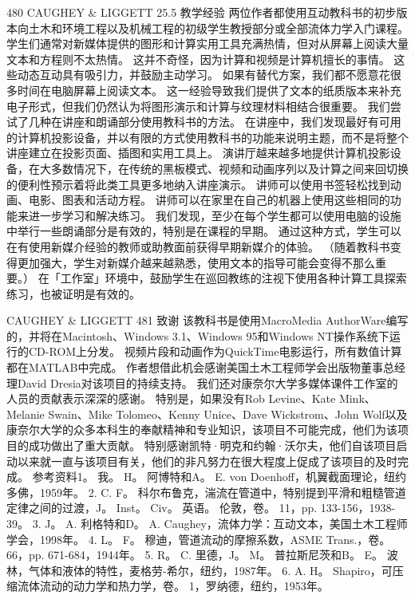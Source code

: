 \documentclass[UTF8,11pt,a4paper,openany,fontset=fandol]{ctexbook}
\begin{document}
480 CAUGHEY \& LIGGETT 25.5 教学经验 两位作者都使用互动教科书的初步版本向土木和环境工程以及机械工程的初级学生教授部分或全部流体力学入门课程。 学生们通常对新媒体提供的图形和计算实用工具充满热情，但对从屏幕上阅读大量文本和方程则不太热情。 这并不奇怪，因为计算和视频是计算机擅长的事情。 这些动态互动具有吸引力，并鼓励主动学习。 如果有替代方案，我们都不愿意花很多时间在电脑屏幕上阅读文本。 这一经验导致我们提供了文本的纸质版本来补充电子形式，但我们仍然认为将图形演示和计算与纹理材料相结合很重要。 我们尝试了几种在讲座和朗诵部分使用教科书的方法。 在讲座中，我们发现最好有可用的计算机投影设备，并以有限的方式使用教科书的功能来说明主题，而不是将整个讲座建立在投影页面、插图和实用工具上。 演讲厅越来越多地提供计算机投影设备，在大多数情况下，在传统的黑板模式、视频和动画序列以及计算之间来回切换的便利性预示着将此类工具更多地纳入讲座演示。 讲师可以使用书签轻松找到动画、电影、图表和活动方程。 讲师可以在家里在自己的机器上使用这些相同的功能来进一步学习和解决练习。 我们发现，至少在每个学生都可以使用电脑的设施中举行一些朗诵部分是有效的，特别是在课程的早期。 通过这种方式，学生可以在有使用新媒介经验的教师或助教面前获得早期新媒介的体验。 （随着教科书变得更加强大，学生对新媒介越来越熟悉，使用文本的指导可能会变得不那么重要。） 在「工作室」环境中，鼓励学生在巡回教练的注视下使用各种计算工具探索练习，也被证明是有效的。

CAUGHEY \& LIGGETT 481 致谢 该教科书是使用MacroMedia AuthorWare编写的，并将在Macintosh、Windows 3.1、Windows 95和Windows NT操作系统下运行的CD-ROM上分发。 视频片段和动画作为QuickTime电影运行，所有数值计算都在MATLAB中完成。 作者想借此机会感谢美国土木工程师学会出版物董事总经理David Dresia对该项目的持续支持。 我们还对康奈尔大学多媒体课件工作室的人员的贡献表示深深的感谢。 特别是，如果没有Rob Levine、Kate Mink、Melanie Swain、Mike Tolomeo、Kenny Unice、Dave Wickstrom、John Wolf以及康奈尔大学的众多本科生的奉献精神和专业知识，该项目不可能完成，他们为该项目的成功做出了重大贡献。 特别感谢凯特·明克和约翰·沃尔夫，他们自该项目启动以来就一直与该项目有关，他们的非凡努力在很大程度上促成了该项目的及时完成。 参考资料1。 我。 H。 阿博特和A。 E. von Doenhoff，机翼截面理论，纽约多佛，1959年。 2. C. F。 科尔布鲁克，湍流在管道中，特别提到平滑和粗糙管道定律之间的过渡，J。 Inst。 Civ。 英语。 伦敦，卷。 11，pp. 133-156，1938-39。 3. J。 A. 利格特和D。 A. Caughey，流体力学：互动文本，美国土木工程师学会，1998年。 4. L。 F。 穆迪，管道流动的摩擦系数，ASME Trans.，卷。 66，pp. 671-684，1944年。 5. R。 C. 里德，J。 M。 普拉斯尼茨和B。 E。 波林，气体和液体的特性，麦格劳-希尔，纽约，1987年。 6. A. H。 Shapiro，可压缩流体流动的动力学和热力学，卷。 1，罗纳德，纽约，1953年。
\end{document}
